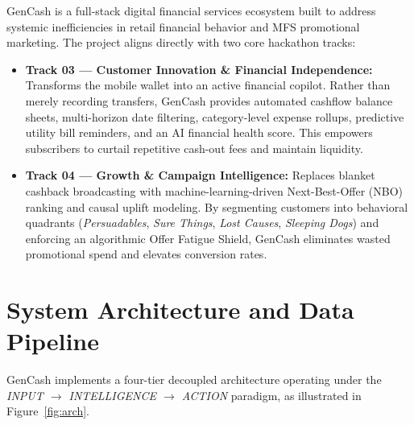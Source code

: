 \documentclass[10.5pt,a4paper]{article}
\begin{document}
GenCash is a full-stack digital financial services ecosystem built to address systemic inefficiencies in retail financial behavior and MFS promotional marketing. The project aligns directly with two core hackathon tracks:
\begin{itemize}[leftmargin=*]
    \item \textbf{Track 03 --- Customer Innovation \& Financial Independence:} Transforms the mobile wallet into an active financial copilot. Rather than merely recording transfers, GenCash provides automated cashflow balance sheets, multi-horizon date filtering, category-level expense rollups, predictive utility bill reminders, and an AI financial health score. This empowers subscribers to curtail repetitive cash-out fees and maintain liquidity.
    \item \textbf{Track 04 --- Growth \& Campaign Intelligence:} Replaces blanket cashback broadcasting with machine-learning-driven Next-Best-Offer (NBO) ranking and causal uplift modeling. By segmenting customers into behavioral quadrants (\textit{Persuadables}, \textit{Sure Things}, \textit{Lost Causes}, \textit{Sleeping Dogs}) and enforcing an algorithmic Offer Fatigue Shield, GenCash eliminates wasted promotional spend and elevates conversion rates.
\end{itemize}

\section{System Architecture and Data Pipeline}

GenCash implements a four-tier decoupled architecture operating under the \textit{INPUT $\rightarrow$ INTELLIGENCE $\rightarrow$ ACTION} paradigm, as illustrated in Figure~\ref{fig:arch}.
\end{document}
